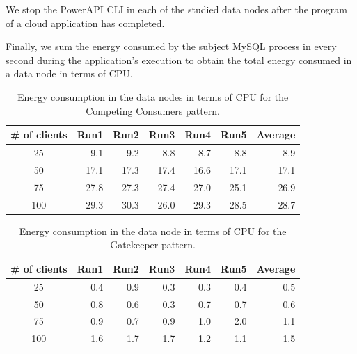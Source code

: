 \documentclass{article}
\begin{document}
We stop the PowerAPI CLI in each of the studied data nodes after the program of a cloud application has completed.

Finally, we sum the energy consumed by the subject MySQL process in every second during the application's execution to obtain the total energy consumed in a data node in terms of CPU.


\begin{table}[t]
    \centering
    \caption{Energy consumption in the data nodes in terms of CPU for the Competing Consumers pattern.}
    \label{tab:ccp_energy}
    \begin{tabular}{|c|r|r|r|r|r|r|}
        \hline
        \textbf{\# of clients} & \textbf{Run1} & \textbf{Run2} & \textbf{Run3} & \textbf{Run4} & \textbf{Run5} & \textbf{Average}\\ \hline
        25 & 9.1 & 9.2 & 8.8 & 8.7 & 8.8 & 8.9 \\ \hline 
        50 & 17.1 & 17.3 & 17.4 & 16.6 & 17.1 & 17.1 \\ \hline
        75 & 27.8 & 27.3 & 27.4 & 27.0 & 25.1 & 26.9 \\ \hline
        100 & 29.3 & 30.3 & 26.0 & 29.3 & 28.5 & 28.7 \\ \hline
	\end{tabular}
\end{table}

\begin{table}[]
    \centering
    \caption{Energy consumption in the data node in terms of CPU for the Gatekeeper pattern.}
    \label{tab:gatekeeper_energy}
    \begin{tabular}{|c|r|r|r|r|r|r|}
        \hline
        \textbf{\# of clients} & \textbf{Run1} & \textbf{Run2} & \textbf{Run3} & \textbf{Run4} & \textbf{Run5} & \textbf{Average}\\ \hline
        25 & 0.4 & 0.9 & 0.3 & 0.3 & 0.4 & 0.5 \\ \hline 
        50 & 0.8 & 0.6 & 0.3 & 0.7 & 0.7 & 0.6 \\ \hline 
        75 & 0.9 & 0.7 & 0.9 & 1.0 & 2.0 & 1.1 \\ \hline 
        100 & 1.6 & 1.7 & 1.7 & 1.2 & 1.1 & 1.5 \\ \hline 
	\end{tabular}
\end{table}
\end{document}
